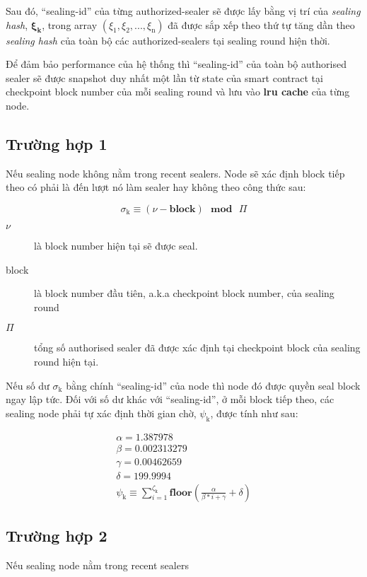 \documentclass[12pt]{amsart}
\begin{document}
\begin{multicols}{2}
Sau đó, ``sealing-id'' của từng authorized-sealer sẽ được lấy bằng vị trí của \textit{sealing hash}, $\boldsymbol{\xi_k}$, trong array $(\xi_{\mathrm{1}}, \xi_{\mathrm{2}}, ..., \xi_{\mathrm{n}})$ đã được sắp xếp theo thứ tự tăng dần theo \textit{sealing hash} của toàn bộ các authorized-sealers tại sealing round hiện thời.

Để đảm bảo performance của hệ thống thì ``sealing-id'' của toàn bộ authorised sealer sẽ được snapshot duy nhất một lần từ state của smart contract tại checkpoint block number của mỗi sealing round và lưu vào \textbf{lru cache} của từng node.

\subsection{Trường hợp 1} Nếu sealing node không nằm trong recent sealers. Node sẽ xác định block tiếp theo có phải là đến lượt nó làm sealer hay không theo công thức sau:

\begin{equation}
\sigma_{\mathrm{k}} \equiv (\nu - \mathbf{block}) \ \ \ \mathbf{mod} \ \ \ \Pi
\end{equation}

\begin{description}
\item[$\nu$] là block number hiện tại sẽ được seal.
\item[block] là block number đầu tiên, a.k.a checkpoint block number, của sealing round
\item[$\Pi$] tổng số authorised sealer đã được xác định tại checkpoint block của sealing round hiện tại.
\end{description}

Nếu số dư $\sigma_{\mathrm{k}}$ bằng chính ``sealing-id'' của node thì node đó được quyền seal block ngay lập tức. Đối với số dư khác với ``sealing-id'', ở mỗi block tiếp theo, các sealing node phải tự xác định thời gian chờ, $\psi_{\mathrm{k}}$, được tính như sau:

\begin{eqnarray}
\alpha = 1.387978 \\
\beta = 0.002313279 \\
\gamma = 0.00462659 \\
\delta = 199.9994 \\
\psi_{\mathrm{k}} \equiv \sum_{i=1}^{\zeta_\mathrm{k}} \mathbf{floor}(\frac{\alpha}{\beta*i+\gamma} + \delta)
\end{eqnarray}

\subsection{Trường hợp 2} Nếu sealing node nằm trong recent sealers


\end{multicols}
\end{document}

